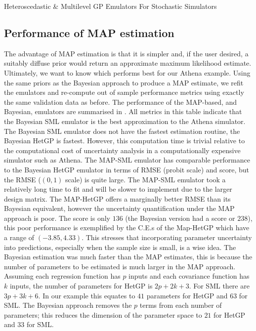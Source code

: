 \begin{chapter}{Heteroscedastic \& Multilevel GP Emulators For Stochastic Simulators\label{Ch:Hetsml}}
\subsection{Performance of MAP estimation}
The advantage of MAP estimation is that it is simpler and, if the user desired, a suitably diffuse prior would return an approximate maximum likelihood estimate. Ultimately, we want to know which performs best for our Athena example. Using the same priors as the Bayesian approach to produce a MAP estimate, we refit the emulators and re-compute out of sample performance metrics using exactly the same validation data as before.
The performance of the MAP-based, and Bayesian, emulators are summarised in . All metrics in this table indicate that the Bayesian SML emulator is the best approximation to the Athena simulator. The Bayesian SML emulator does not have the fastest estimation routine, the Bayesian HetGP is fastest. However, this computation time is trivial relative to the computational cost of uncertainty analysis in a computationally expensive simulator such as Athena. The MAP-SML emulator has comparable performance to the Bayesian HetGP emulator in terms of RMSE (probit scale) and score, but the RMSE ($(0,1)$ scale) is quite large. The MAP-SML emulator took a relatively long time to fit and will be slower to implement due to the larger design matrix. The MAP-HetGP offers a marginally better RMSE than its Bayesian equivalent, however the uncertainty quantification under the MAP approach is poor. The score is only $136$ (the Bayesian version had a score or $238$), this poor performance is exemplified by the C.E.s of the Map-HetGP which have a range of $(-3.85, 4.33)$. This stresses that incorporating parameter uncertainty into predictions, especially when the sample size is small, is a wise idea. The Bayesian estimation was much faster than the MAP estimates, this is because the number of parameters to be estimated is much larger in the MAP approach. Assuming each regression function has $p$ inputs and each covariance function has $k$ inputs, the number of parameters for HetGP is $2p + 2k + 3$. For SML there are $3p + 3k + 6$. In our example this equates to $41$ parameters for HetGP and $63$ for SML. The Bayesian approach removes the $p$ terms from each number of parameters; this reduces the dimension of the parameter space to $21$ for HetGP and $33$ for SML.
\begin{table}
	\centering
	\begin{tabular}{lrrrr}
		\toprule

\end{tabular}
\end{table}
\end{chapter}
